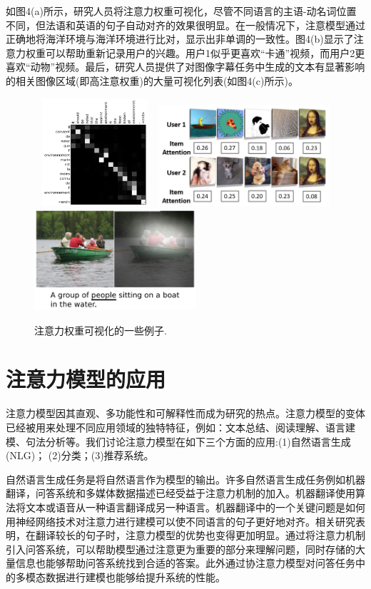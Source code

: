 \documentclass{ctexart}
\begin{document}
如图4(a)所示，研究人员将注意力权重可视化，尽管不同语言的主语-动名词位置不同，但法语和英语的句子自动对齐的效果很明显。在一般情况下，注意模型通过正确地将海洋环境与海洋环境进行比对，显示出非单调的一致性。图4(b)显示了注意力权重可以帮助重新记录用户的兴趣。用户1似乎更喜欢“卡通”视频，而用户2更喜欢“动物”视频。最后，研究人员提供了对图像字幕任务中生成的文本有显著影响的相关图像区域(即高注意权重)的大量可视化列表(如图4(c)所示)。
\begin{figure}[!h]
	\centering
	\includegraphics[width=4.5cm, height=4cm]{alignment.png} 
	\includegraphics[width=5 cm, height=3.75cm]{rec.png}
	\includegraphics[width=5 cm, height=3.75cm]{caption.png}
	\caption{注意力权重可视化的一些例子.}
\end{figure}
\section{注意力模型的应用}
注意力模型因其直观、多功能性和可解释性而成为研究的热点。注意力模型的变体已经被用来处理不同应用领域的独特特征，例如：文本总结、阅读理解、语言建模、句法分析等。我们讨论注意力模型在如下三个方面的应用:(1)自然语言生成(NLG)； (2)分类；(3)推荐系统。


自然语言生成任务是将自然语言作为模型的输出。许多自然语言生成任务例如机器翻译，问答系统和多媒体数据描述已经受益于注意力机制的加入。机器翻译使用算法将文本或语音从一种语言翻译成另一种语言。机器翻译中的一个关键问题是如何用神经网络技术对注意力进行建模可以使不同语言的句子更好地对齐。相关研究表明，在翻译较长的句子时，注意力模型的优势也变得更加明显。通过将注意力机制引入问答系统，可以帮助模型通过注意更为重要的部分来理解问题，同时存储的大量信息也能够帮助问答系统找到合适的答案。此外通过协注意力模型对问答任务中的多模态数据进行建模也能够给提升系统的性能。
\end{document}
